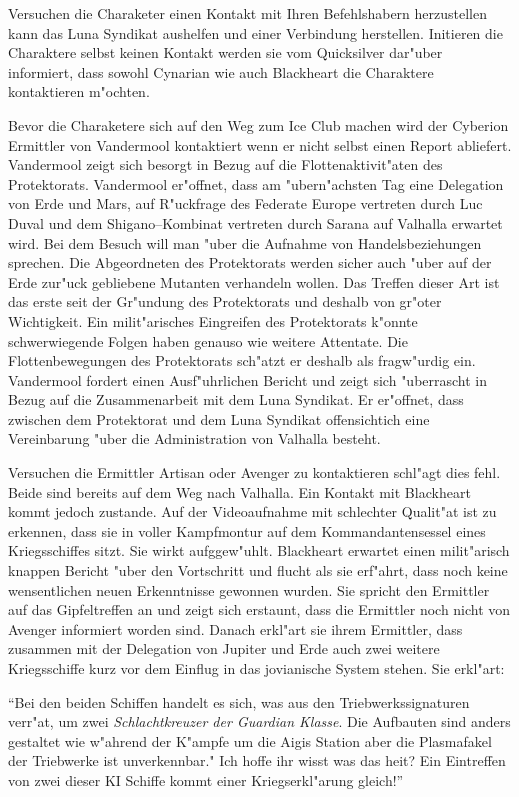 Versuchen die Charaketer einen Kontakt mit Ihren Befehlshabern herzustellen kann das Luna Syndikat aushelfen und einer Verbindung herstellen. Initieren die Charaktere selbst keinen Kontakt werden sie vom Quicksilver dar"uber informiert, dass sowohl Cynarian wie auch Blackheart die Charaktere kontaktieren m"ochten.

Bevor die Charaketere sich auf den Weg zum Ice Club machen wird der Cyberion Ermittler von Vandermool kontaktiert wenn er nicht selbst einen Report abliefert. Vandermool zeigt sich besorgt in Bezug auf die Flottenaktivit"aten des Protektorats. Vandermool er"offnet, dass am "ubern"achsten Tag eine Delegation von Erde und Mars, auf R"uckfrage des Federate Europe vertreten durch Luc Duval und dem Shigano--Kombinat vertreten durch Sarana auf Valhalla erwartet wird. Bei dem Besuch will man "uber die Aufnahme von Handelsbeziehungen sprechen. Die Abgeordneten des Protektorats werden sicher auch "uber auf der Erde zur"uck gebliebene Mutanten verhandeln wollen. Das Treffen dieser Art ist das erste seit der Gr"undung des Protektorats und deshalb von gr"o\3ter Wichtigkeit. Ein milit"arisches Eingreifen des Protektorats k"onnte schwerwiegende Folgen haben genauso wie weitere Attentate. Die Flottenbewegungen des Protektorats sch"atzt er deshalb als fragw"urdig ein. Vandermool fordert einen Ausf"uhrlichen Bericht und zeigt sich "uberrascht in Bezug auf die Zusammenarbeit mit dem Luna Syndikat. Er er"offnet, dass zwischen dem Protektorat und dem Luna Syndikat offensichtich eine Vereinbarung "uber die Administration von Valhalla besteht.

Versuchen die Ermittler Artisan oder Avenger zu kontaktieren schl"agt dies fehl. Beide sind bereits auf dem Weg nach Valhalla. Ein Kontakt mit Blackheart kommt jedoch zustande. Auf der Videoaufnahme mit schlechter Qualit"at ist zu erkennen, dass sie in voller Kampfmontur auf dem Kommandantensessel eines Kriegsschiffes sitzt. Sie wirkt aufggew"uhlt. Blackheart erwartet einen milit"arisch knappen Bericht "uber den Vortschritt und flucht als sie erf"ahrt, dass noch keine wensentlichen neuen Erkenntnisse gewonnen wurden. Sie spricht den Ermittler auf das Gipfeltreffen an und zeigt sich erstaunt, dass die Ermittler noch nicht von Avenger informiert worden sind. Danach erkl"art sie ihrem Ermittler, dass zusammen mit der Delegation von Jupiter und Erde auch zwei weitere Kriegsschiffe kurz vor dem Einflug in das jovianische System stehen. Sie erkl"art:

"`Bei den beiden Schiffen handelt es sich, was aus den Triebwerkssignaturen verr"at, um zwei \emph{Schlachtkreuzer der Guardian Klasse}. Die Aufbauten sind anders gestaltet wie w"ahrend der K"ampfe um die Aigis Station aber die Plasmafakel der Triebwerke ist unverkennbar." Ich hoffe ihr wisst was das hei\3t? Ein Eintreffen von zwei dieser KI Schiffe kommt einer Kriegserkl"arung gleich!"' 

